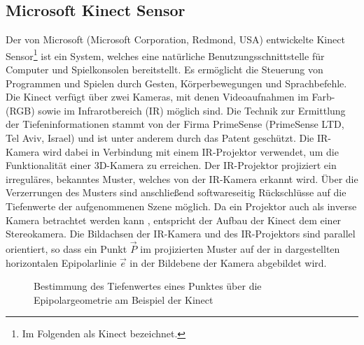 \subsection{Microsoft Kinect\textsuperscript{\texttrademark} Sensor}
\label{chap.kinect}
Der von Microsoft (Microsoft Corporation, Redmond, USA) entwickelte Kinect\textsuperscript{\texttrademark} Sensor\footnote{Im Folgenden als Kinect bezeichnet.} ist ein System, welches eine natürliche Benutzungsschnittstelle für Computer und Spielkonsolen bereitstellt. Es ermöglicht die Steuerung von Programmen und Spielen durch Gesten, Körperbewegungen und Sprachbefehle. Die Kinect verfügt über zwei Kameras, mit denen Videoaufnahmen im Farb- (RGB) sowie im Infrarotbereich (IR) möglich sind. Die Technik zur Ermittlung der Tiefeninformationen stammt von der Firma PrimeSense (PrimeSense LTD, Tel Aviv, Israel) und ist unter anderem durch das Patent \cite{Freedman2008} geschützt. Die IR-Kamera wird dabei in Verbindung mit einem IR-Projektor verwendet, um die Funktionalität einer 3D-Kamera zu erreichen. Der IR-Projektor projiziert ein irreguläres, bekanntes Muster, welches von der IR-Kamera erkannt wird. Über die Verzerrungen des Musters sind anschließend softwareseitig Rückschlüsse auf die Tiefenwerte der aufgenommenen Szene möglich. Da ein Projektor auch als inverse Kamera betrachtet werden kann \cite{Kimura2007}, entspricht der Aufbau der Kinect dem einer Stereokamera. Die Bildachsen der IR-Kamera und des IR-Projektors sind parallel orientiert, so dass ein Punkt $\vec{P}$ im projizierten Muster auf der in  dargestellten horizontalen Epipolarlinie $\vec{e}$ in der Bildebene der Kamera abgebildet wird.\\


\begin{figure}[ht]
	\begin{center}
		\caption{Bestimmung des Tiefenwertes eines Punktes über die Epipolargeometrie am Beispiel der Kinect}
		\label{fig.kinect_depth}
	\end{center}
\end{figure}

\prever{
}

